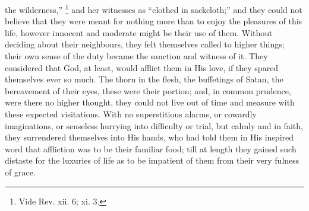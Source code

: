 the wilderness,'' \footnote{Vide Rev. xii. 6; xi. 3.} and
her witnesses as ``clothed in sackcloth;'' and they could not
believe that they were meant for nothing more than to enjoy the
pleasures of this life, however innocent and moderate might be their
use of them. Without deciding about their neighbours, they felt
themselves called to higher things; their own sense of the duty became
the sanction and witness of it. They considered that God, at least,
would afflict them in His love, if they spared themselves ever so
much. The thorn in the flesh, the buffetings of Satan, the bereavement
of their eyes, these were their portion; and, in common prudence, were
there no higher thought, they could not live out of time and measure
with these expected visitations. With no superstitious alarms, or
cowardly imaginations, or senseless hurrying into difficulty or trial,
but calmly and in faith, they surrendered themselves into His hands,
who had told them in His inspired word that affliction was to be their
familiar food; till at length they gained such distaste for the
luxuries of life as to be impatient of them from their very fulness of
grace.

